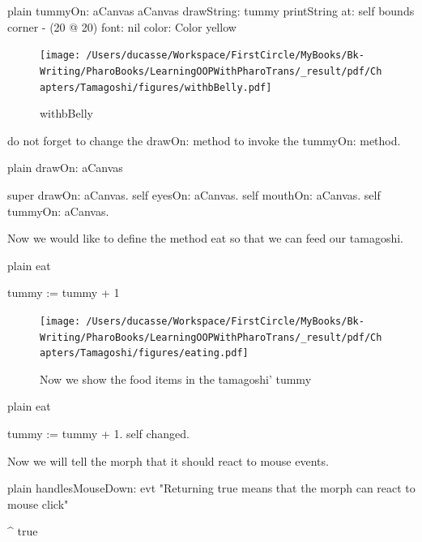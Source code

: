\documentclass[10pt,twoside,english]{_support/latex/sbabook/sbabook}
\begin{document}
\begin{displaycode}{plain}
tummyOn: aCanvas
	aCanvas
		drawString: tummy printString
		at: self bounds corner - (20 @ 20)
		font: nil
		color: Color yellow
\end{displaycode}


\begin{figure}

\begin{center}
\texttt{[image: /Users/ducasse/Workspace/FirstCircle/MyBooks/Bk-Writing/PharoBooks/LearningOOPWithPharoTrans/\_result/pdf/Chapters/Tamagoshi/figures/withbBelly.pdf]}\caption{withbBelly\label{withbBelly}}\end{center}
\end{figure}


do not forget to change the drawOn: method to invoke the tummyOn: method.

\begin{displaycode}{plain}
drawOn: aCanvas

	super drawOn: aCanvas.
	self eyesOn: aCanvas.
	self mouthOn: aCanvas.
	self tummyOn: aCanvas. 
\end{displaycode}

Now we would like to define the method eat so that we can feed our tamagoshi.

\begin{displaycode}{plain}
eat 

	tummy := tummy + 1
\end{displaycode}


\begin{figure}

\begin{center}
\texttt{[image: /Users/ducasse/Workspace/FirstCircle/MyBooks/Bk-Writing/PharoBooks/LearningOOPWithPharoTrans/\_result/pdf/Chapters/Tamagoshi/figures/eating.pdf]}\caption{Now we show the food items in the tamagoshi' tummy\label{eating}}\end{center}
\end{figure}


\begin{displaycode}{plain}
eat 

	tummy := tummy + 1.
	self changed.
\end{displaycode}

Now we will tell the morph that it should react to mouse events.

\begin{displaycode}{plain}
handlesMouseDown: evt
	"Returning true means that the morph can react to mouse click"

	^ true
\end{displaycode}
\end{document}

